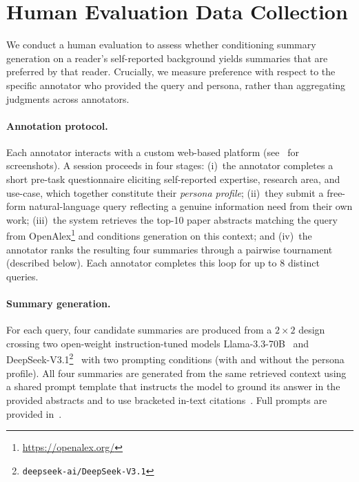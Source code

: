 \section[Human Evaluation Data Collection]{Human Evaluation Data Collection \hyperref[chsevenrq2]{\chsevenrqtwo}}\label{sec:ch-7-human-eval-setup}

We conduct a human evaluation to assess whether conditioning summary
generation on a reader's self-reported background yields summaries that
are preferred by that reader. Crucially, we measure preference with
respect to the specific annotator who provided the query and persona,
rather than aggregating judgments across annotators.

\paragraph{Annotation protocol.}
Each annotator interacts with a custom web-based platform
(see~ for screenshots). A session proceeds in four stages:
(i)~the annotator completes a short pre-task questionnaire eliciting
self-reported expertise, research area, and use-case, which together
constitute their \emph{persona profile};
(ii)~they submit a free-form natural-language query reflecting a
genuine information need from their own work;
(iii)~the system retrieves the top-10 paper abstracts matching the
query from OpenAlex\footnote{\url{https://openalex.org/}} and conditions generation on this
context; and
(iv)~the annotator ranks the resulting four summaries through a
pairwise tournament (described below). Each annotator completes this
loop for up to 8 distinct queries.

\paragraph{Summary generation.} For each query, four candidate summaries are produced from a
$2 \times 2$ design crossing two open-weight instruction-tuned models
Llama-3.3-70B~\cite{grattafiori2024llama3}
and DeepSeek-V3.1\footnote{\texttt{deepseek-ai/DeepSeek-V3.1}}~\cite{deepseekai2024deepseekv3technicalreport} with
two prompting conditions (with and without the persona profile). All
four summaries are generated from the same retrieved context using a
shared prompt template that instructs the model to ground its answer
in the provided abstracts and to use bracketed in-text
citations~\cite{lewis2020rag,gao2023ragsurvey}. Full prompts are
provided in~.

